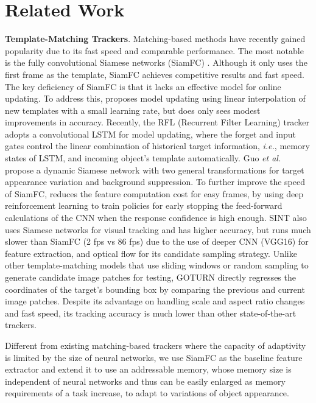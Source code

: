 \documentclass[runningheads]{llncs}
\begin{document}
\section{Related Work}
\textbf{Template-Matching Trackers}. Matching-based methods have recently gained popularity due to its fast speed and comparable performance. The most notable is the fully convolutional Siamese networks (SiamFC) \cite{Bertinetto2016}. Although it only uses the first frame as the template, SiamFC achieves competitive results and fast speed. The key deficiency of SiamFC is that it lacks an effective model for online updating. 
To address this, \cite{Valmadre2017} proposes model updating using linear interpolation of new templates with a small learning rate, but does only sees modest improvements in accuracy.
%
Recently, the RFL (Recurrent Filter Learning) tracker \cite{Yang2017} adopts a convolutional LSTM for model updating, where the forget and input gates control the linear combination of historical target information, \emph{i.e.}, memory states of LSTM, and incoming object's template automatically. Guo \emph{et al.} \cite{Guo2017} propose a dynamic Siamese network with two general transformations for target appearance variation and background suppression.
To further improve the speed of SiamFC, \cite{Huang2017} 
reduces the feature computation cost for easy frames, by using deep reinforcement learning to train policies for early stopping the feed-forward calculations of the CNN when the response confidence is high enough.
%
SINT \cite{Tao2016} also uses Siamese networks for visual tracking and has higher accuracy, but runs much slower than SiamFC (2 fps vs 86 fps) due to the use of deeper CNN (VGG16) for feature extraction, and optical flow for its candidate sampling strategy. Unlike other template-matching models that use sliding windows or random sampling to generate candidate image patches for testing, GOTURN \cite{Held2016} directly regresses the coordinates of the target's bounding box by comparing the previous and current image patches. Despite its advantage on handling scale and aspect ratio changes and fast speed, its tracking accuracy is much lower than other state-of-the-art trackers. 

Different from existing matching-based trackers where the capacity of adaptivity is limited by the size of neural networks, we use  SiamFC \cite{Bertinetto2016} as the baseline feature extractor and extend it to use an addressable memory, whose memory size is independent of neural networks and thus can be easily enlarged as memory requirements of a task increase, to adapt to variations of object appearance.
\end{document}
